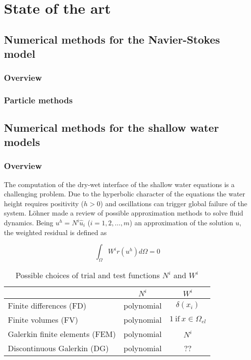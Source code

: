 
\chapter{State of the art}
\label{state_art}



\section{Numerical methods for the Navier-Stokes model}

\subsection{Overview}

\subsection{Particle methods}



\section{Numerical methods for the shallow water models}


\subsection{Overview}

The computation of the dry-wet interface of the shallow water equations is a challenging problem. Due to the hyperbolic character of the equations the water height requires positivity ($h>0$) and oscillations can trigger global failure of the system. Löhner \cite{lohner2008} made a review of possible approximation methods to solve fluid dynamics. Being $u^h = N^i\hat{u}_i$ ($i=1,2,\dots,m$) an approximation of the solution $u$, the weighted residual is defined as

\begin{equation}
\int_{\Omega} W^ir(u^h)d\Omega = 0
\end{equation}

\begin{table}
\centering
\begin{tabular}{|l|c|c|}
\hline
 & $N^i$ & $W^i$ \\ \hline
Finite differences (FD)         & polynomial & $\delta(x_i)$ \\ \hline
Finite volumes (FV)             & polynomial & $1 \ \text{if} \ x\in\Omega_{el}$ \\ \hline
Galerkin finite elements (FEM)  & polynomial & $N^i$ \\ \hline
Discontinuous Galerkin (DG)     & polynomial & ?? \\ \hline
\end{tabular}
\caption{Possible choices of trial and test functions $N^i$ and $W^i$}
\label{possible_trial_functions}
\end{table}

